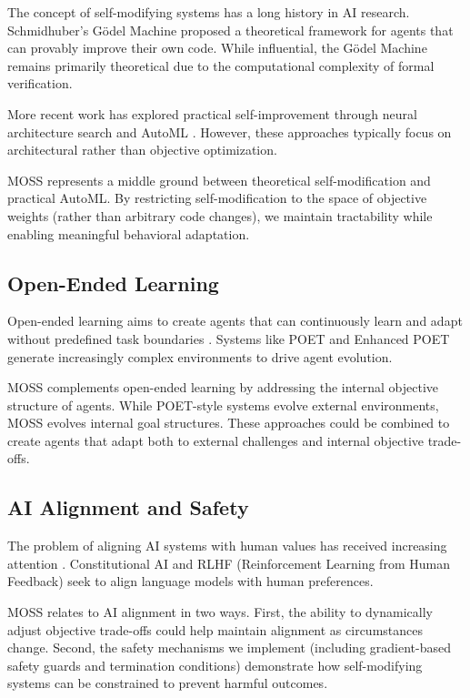 \documentclass{article}
\begin{document}
The concept of self-modifying systems has a long history in AI research. Schmidhuber's G\"{o}del Machine \cite{schmidhuber2007godel} proposed a theoretical framework for agents that can provably improve their own code. While influential, the G\"{o}del Machine remains primarily theoretical due to the computational complexity of formal verification.

More recent work has explored practical self-improvement through neural architecture search \cite{elsken2019neural} and AutoML \cite{he2021automl}. However, these approaches typically focus on architectural rather than objective optimization.

MOSS represents a middle ground between theoretical self-modification and practical AutoML. By restricting self-modification to the space of objective weights (rather than arbitrary code changes), we maintain tractability while enabling meaningful behavioral adaptation.

\subsection{Open-Ended Learning}

Open-ended learning aims to create agents that can continuously learn and adapt without predefined task boundaries \cite{stanley2019open}. Systems like POET \cite{wang2019paired} and Enhanced POET \cite{wang2020enhanced} generate increasingly complex environments to drive agent evolution.

MOSS complements open-ended learning by addressing the internal objective structure of agents. While POET-style systems evolve external environments, MOSS evolves internal goal structures. These approaches could be combined to create agents that adapt both to external challenges and internal objective trade-offs.

\subsection{AI Alignment and Safety}

The problem of aligning AI systems with human values has received increasing attention \cite{hendrycks2021aligning, ji2023ai}. Constitutional AI \cite{bai2022constitutional} and RLHF (Reinforcement Learning from Human Feedback) \cite{ouyang2022training} seek to align language models with human preferences.

MOSS relates to AI alignment in two ways. First, the ability to dynamically adjust objective trade-offs could help maintain alignment as circumstances change. Second, the safety mechanisms we implement (including gradient-based safety guards and termination conditions) demonstrate how self-modifying systems can be constrained to prevent harmful outcomes.
\end{document}
